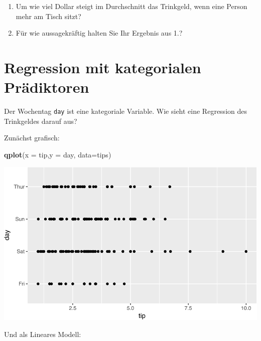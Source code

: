 \documentclass[12pt,ngerman,]{book}
\newenvironment{Shaded}{\begin{snugshade}}{\end{snugshade}}
\newcommand{\KeywordTok}[1]{\textcolor[rgb]{0.13,0.29,0.53}{\textbf{{#1}}}}
\newcommand{\DataTypeTok}[1]{\textcolor[rgb]{0.13,0.29,0.53}{{#1}}}
\newcommand{\NormalTok}[1]{{#1}}
\renewenvironment{Shaded}{\begin{kframe}}{\end{kframe}}
\let\BeginKnitrBlock\begin \let\EndKnitrBlock\end
\begin{document}
\BeginKnitrBlock{rmdexercises}
\begin{enumerate}
\def\labelenumi{\arabic{enumi}.}
\item
  Um wie viel Dollar steigt im Durchschnitt das Trinkgeld, wenn eine
  Person mehr am Tisch sitzt?
\item
  Für wie aussagekräftig halten Sie Ihr Ergebnis aus 1.?
\end{enumerate}
\EndKnitrBlock{rmdexercises}

\section{Regression mit kategorialen
Prädiktoren}\label{regression-mit-kategorialen-pradiktoren}

Der Wochentag \texttt{day} ist eine kategoriale Variable. Wie sieht eine
Regression des Trinkgeldes darauf aus?

Zunächst grafisch:

\begin{Shaded}
\begin{Highlighting}[]
\KeywordTok{qplot}\NormalTok{(}\DataTypeTok{x =} \NormalTok{tip,}\DataTypeTok{y =} \NormalTok{day, }\DataTypeTok{data=}\NormalTok{tips)}
\end{Highlighting}
\end{Shaded}

\begin{center}\includegraphics[width=0.7\linewidth]{071_Regression_files/figure-latex/unnamed-chunk-11-1} \end{center}

Und als Lineares Modell:
\end{document}
